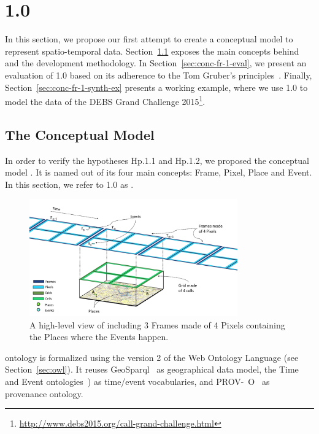 \section{\frappe{} 1.0}\label{sec:conc-fr-1}
In this section, we propose our first attempt to create a conceptual model to represent spatio-temporal data.
Section~\ref{sec:conc-fr-1-mod} exposes the main concepts behind \frappe{} and the development methodology.
In Section~\ref{sec:conc-fr-1-eval}, we present an evaluation of \frappe{} 1.0 based on its adherence to the Tom Gruber's  principles~\cite{DBLP:journals/ijmms/Gruber95}.
Finally, Section~\ref{sec:conc-fr-1-synth-ex} presents a working example, where we use \frappe{} 1.0 to model the data of the DEBS Grand Challenge 2015\footnote{\url{http://www.debs2015.org/call-grand-challenge.html}}.

\subsection{The Conceptual Model}\label{sec:conc-fr-1-mod}
In order to verify the hypotheses \textsf{Hp.1.1} and \textsf{Hp.1.2}, we proposed the conceptual model \frappe{}. It is named out of its four main concepts: Frame, Pixel, Place and Event.
In this section, we refer to \frappe{} 1.0 as \frappe{}.

\begin{figure}[t]
\centering
\includegraphics[width=0.8\textwidth]{img/conceptual-model-overview}
\caption{A high-level view of \frappe{} including 3 \textsf{Frame}s made of
4 \textsf{Pixel}s containing the \textsf{Place}s where the \textsf{Event}s happen.}
\label{fig:overview}
\end{figure}

\frappe{} ontology is formalized using the version 2 of the Web Ontology Language (see Section~\ref{sec:owl}). It reuses GeoSparql~\cite{battle2011geosparql} as geographical data model, the Time~\cite{Hobbs2006} and Event ontologies~\cite{RaimondAbdallahEventOntology2007}) as time/event vocabularies, and PROV-~O~\cite{w3c-prov-o} as provenance ontology. 


